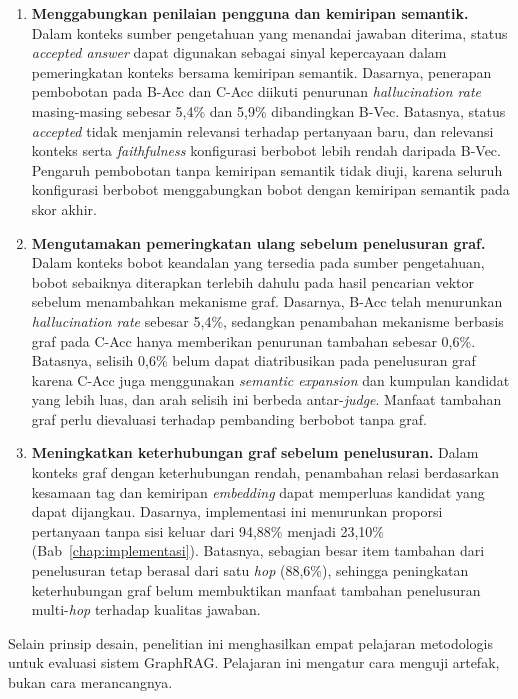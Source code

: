 \begin{enumerate}
    \item \textbf{Menggabungkan penilaian pengguna dan kemiripan semantik.} Dalam konteks sumber pengetahuan yang menandai jawaban diterima, status \emph{accepted answer} dapat digunakan sebagai sinyal kepercayaan dalam pemeringkatan konteks bersama kemiripan semantik. Dasarnya, penerapan pembobotan pada B-Acc dan C-Acc diikuti penurunan \emph{hallucination rate} masing-masing sebesar 5,4\% dan 5,9\% dibandingkan B-Vec. Batasnya, status \emph{accepted} tidak menjamin relevansi terhadap pertanyaan baru, dan relevansi konteks serta \emph{faithfulness} konfigurasi berbobot lebih rendah daripada B-Vec. Pengaruh pembobotan tanpa kemiripan semantik tidak diuji, karena seluruh konfigurasi berbobot menggabungkan bobot dengan kemiripan semantik pada skor akhir.

    \item \textbf{Mengutamakan pemeringkatan ulang sebelum penelusuran graf.} Dalam konteks bobot keandalan yang tersedia pada sumber pengetahuan, bobot sebaiknya diterapkan terlebih dahulu pada hasil pencarian vektor sebelum menambahkan mekanisme graf. Dasarnya, B-Acc telah menurunkan \emph{hallucination rate} sebesar 5,4\%, sedangkan penambahan mekanisme berbasis graf pada C-Acc hanya memberikan penurunan tambahan sebesar 0,6\%. Batasnya, selisih 0,6\% belum dapat diatribusikan pada penelusuran graf karena C-Acc juga menggunakan \emph{semantic expansion} dan kumpulan kandidat yang lebih luas, dan arah selisih ini berbeda antar-\emph{judge}. Manfaat tambahan graf perlu dievaluasi terhadap pembanding berbobot tanpa graf.

    \item \textbf{Meningkatkan keterhubungan graf sebelum penelusuran.} Dalam konteks graf dengan keterhubungan rendah, penambahan relasi berdasarkan kesamaan tag dan kemiripan \emph{embedding} dapat memperluas kandidat yang dapat dijangkau. Dasarnya, implementasi ini menurunkan proporsi pertanyaan tanpa sisi keluar dari 94,88\% menjadi 23,10\% (Bab~\ref{chap:implementasi}). Batasnya, sebagian besar item tambahan dari penelusuran tetap berasal dari satu \emph{hop} (88,6\%), sehingga peningkatan keterhubungan graf belum membuktikan manfaat tambahan penelusuran multi-\emph{hop} terhadap kualitas jawaban.
\end{enumerate}

Selain prinsip desain, penelitian ini menghasilkan empat pelajaran metodologis untuk evaluasi sistem GraphRAG. Pelajaran ini mengatur cara menguji artefak, bukan cara merancangnya.

